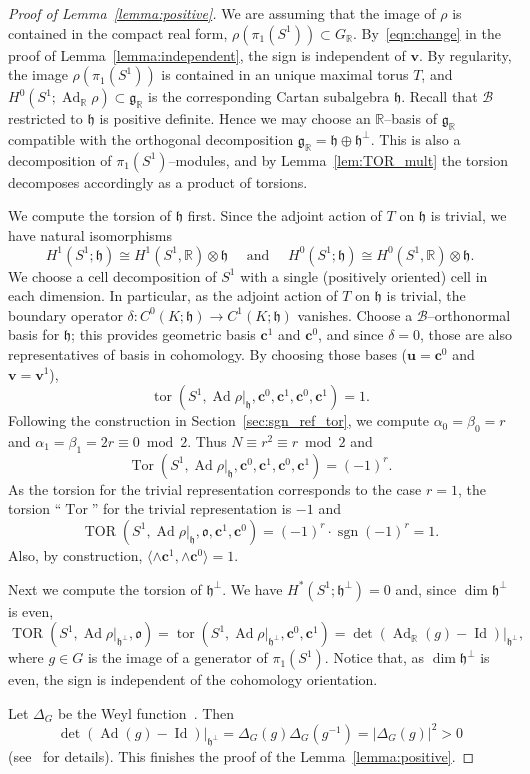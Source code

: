 \documentclass[11pt]{article}
\theoremstyle{definition}
\numberwithin{equation}{section}
\numberwithin{figure}{section}
\numberwithin{table}{section}
\DeclareMathOperator{\tor}{tor}
\DeclareMathOperator{\TOR}{TOR}
\DeclareMathOperator{\Tor}{Tor}
\DeclareMathOperator{\Ad}{Ad}
\DeclareMathOperator{\Id}{Id}
\DeclareMathOperator{\sgn}{sgn}
\newcommand{\Bcal}{\mathcal{B}}
\newcommand{\Rbb}{\mathbb {R}}
\newcommand{\gfrk}{\mathfrak{g}}
\newcommand{\ofrk}{\mathfrak{o}}
\newcommand{\hfrk}{\mathfrak{h}}
\newcommand{\ubf}{\mathbf{u}}
\newcommand{\vbf}{\mathbf{v}}
\newcommand{\cbf}{\mathbf{c}}
\begin{document}
\begin{proof}[Proof of Lemma~\ref{lemma:positive}]
We are assuming that the image of $\rho$ is contained in the compact real form, $\rho(\pi_1(S^1))\subset G_\Rbb$. By~\eqref{eqn:change} in the proof of Lemma~\ref{lemma:independent}, the sign is independent of $\vbf$. By regularity, the image $\rho(\pi_1(S^1))$ is contained in an unique maximal torus $T$, and $H^0(S^1;\Ad_\Rbb\rho)\subset \gfrk_\Rbb$ is the corresponding Cartan subalgebra $\hfrk$. Recall that $\Bcal$ restricted to $\hfrk$ is positive definite. Hence we may choose an ${\Rbb}$--basis of $\gfrk_{\Rbb}$ compatible with the orthogonal decomposition $\gfrk_{\Rbb}=\hfrk \oplus \hfrk^\perp$. This is also a decomposition of $\pi_1(S^1)$--modules, and by Lemma~\ref{lem:TOR_mult} the torsion decomposes accordingly as a product of torsions.


We compute the torsion of $\hfrk $ first. Since the adjoint action of $T$ on $\hfrk $ is trivial, we have natural isomorphisms
\begin{equation}\label{eqn:isos}
H^1(S^1;\hfrk)\cong H^1(S^1,\Rbb)\otimes \hfrk\quad\text{ and }\quad H^0(S^1;\hfrk)\cong H^0(S^1,\Rbb)\otimes \hfrk.
\end{equation}
We choose a cell decomposition of $S^1$ with a single (positively oriented) cell in each dimension. In particular, as the adjoint action of $T$ on $\hfrk$ is trivial, the boundary operator $ \delta\colon C^0(K;\hfrk)\to C^1(K;\hfrk) $ vanishes. Choose a $\Bcal$--orthonormal basis for $\hfrk$; this provides geometric basis $\cbf^1$ and $\cbf^0$, and since $\delta=0$, those are also representatives of basis in cohomology. By choosing those bases ($\ubf=\cbf^0$ and $\vbf=\vbf^1$),
\[
\tor(S^1, \Ad\rho\vert_{\hfrk}, \cbf^0,\cbf^1, \cbf^0,\cbf^1)=1.
\]
Following the construction in Section~\ref{sec:sgn_ref_tor}, we compute $\alpha_0=\beta_0=r$ and $\alpha_1=\beta_1=2r\equiv 0 \bmod 2$. Thus $N \equiv r^2\equiv r\bmod 2$ and
\[
\Tor(S^1, \Ad\rho\vert_{\hfrk}, \cbf^0,\cbf^1, \cbf^0,\cbf^1)=(-1)^r.
\]
As the torsion for the trivial representation corresponds to the case $r=1$, the torsion ``$\Tor$'' for the trivial representation is $-1$ and
\begin{equation}\label{eqn:TORCartan}
\TOR(S^1, \Ad\rho\vert_{\hfrk},\ofrk, \cbf^1,\cbf^0)=(-1)^r\cdot\sgn(-1)^r= 1.
\end{equation}
Also, by construction, $\langle \wedge{\cbf^1},\wedge{\cbf^0}\rangle=1$.


Next we compute the torsion of $\hfrk^\perp $. We have $H^*(S^1;\hfrk^\perp)=0$ and, since $\dim\hfrk^\perp$ is even,
\[
\TOR(S^1,\Ad\rho\vert_{ \hfrk^\perp},\ofrk) =\tor(S^1,\Ad\rho\vert_{ \hfrk^\perp},\cbf^0,\cbf^1) =\det (\Ad_\Rbb(g)-\Id)\vert_{ \hfrk^\perp },
\]
where $g\in G$ is the image of a generator of $\pi_1(S^1)$. Notice that, as $\dim \hfrk^\perp$ is even, the sign is independent of the cohomology orientation.

Let $\Delta_G$ be the Weyl function~\cite{GoodWall}. Then
\[
\det (\Ad(g)-\Id)\vert_{ \hfrk^\perp }= \Delta_G(g) \Delta_G(g^{-1})= \vert \Delta_G(g) \vert ^2>0
\]
(see~\cite[(7.47)]{GoodWall} for details). This finishes the proof of the Lemma~\ref{lemma:positive}.
\end{proof}
\end{document}
